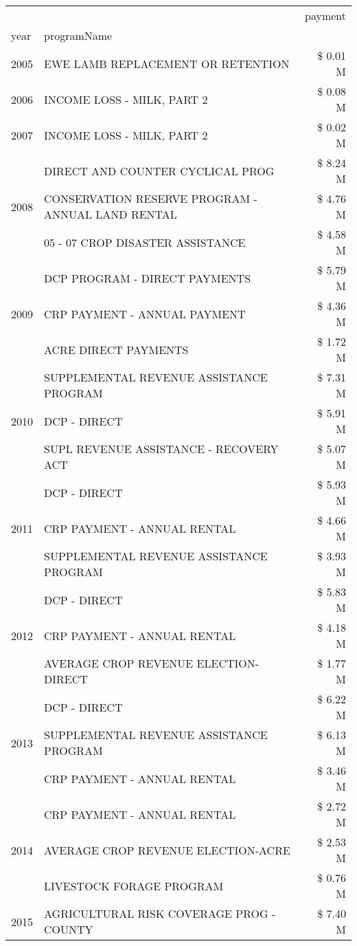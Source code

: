\begin{tabular}{llr}
\toprule
 &  & payment \\
year & programName &  \\
\midrule
2005 & EWE LAMB REPLACEMENT OR RETENTION & \$ 0.01 M \\
\cline{1-3}
2006 & INCOME LOSS - MILK, PART 2 & \$ 0.08 M \\
\cline{1-3}
2007 & INCOME LOSS - MILK, PART 2 & \$ 0.02 M \\
\cline{1-3}
\multirow[t]{3}{*}{2008} & DIRECT AND COUNTER CYCLICAL PROG & \$ 8.24 M \\
 & CONSERVATION RESERVE PROGRAM - ANNUAL LAND RENTAL & \$ 4.76 M \\
 & 05 - 07 CROP DISASTER ASSISTANCE & \$ 4.58 M \\
\cline{1-3}
\multirow[t]{3}{*}{2009} & DCP PROGRAM - DIRECT PAYMENTS & \$ 5.79 M \\
 & CRP PAYMENT - ANNUAL PAYMENT & \$ 4.36 M \\
 & ACRE DIRECT PAYMENTS & \$ 1.72 M \\
\cline{1-3}
\multirow[t]{3}{*}{2010} & SUPPLEMENTAL REVENUE ASSISTANCE PROGRAM & \$ 7.31 M \\
 & DCP - DIRECT & \$ 5.91 M \\
 & SUPL REVENUE ASSISTANCE - RECOVERY ACT & \$ 5.07 M \\
\cline{1-3}
\multirow[t]{3}{*}{2011} & DCP - DIRECT & \$ 5.93 M \\
 & CRP PAYMENT - ANNUAL RENTAL & \$ 4.66 M \\
 & SUPPLEMENTAL REVENUE ASSISTANCE PROGRAM & \$ 3.93 M \\
\cline{1-3}
\multirow[t]{3}{*}{2012} & DCP - DIRECT & \$ 5.83 M \\
 & CRP PAYMENT - ANNUAL RENTAL & \$ 4.18 M \\
 & AVERAGE CROP REVENUE ELECTION-DIRECT & \$ 1.77 M \\
\cline{1-3}
\multirow[t]{3}{*}{2013} & DCP - DIRECT & \$ 6.22 M \\
 & SUPPLEMENTAL REVENUE ASSISTANCE PROGRAM & \$ 6.13 M \\
 & CRP PAYMENT - ANNUAL RENTAL & \$ 3.46 M \\
\cline{1-3}
\multirow[t]{3}{*}{2014} & CRP PAYMENT - ANNUAL RENTAL & \$ 2.72 M \\
 & AVERAGE CROP REVENUE ELECTION-ACRE & \$ 2.53 M \\
 & LIVESTOCK FORAGE PROGRAM & \$ 0.76 M \\
\cline{1-3}
\multirow[t]{3}{*}{2015} & AGRICULTURAL RISK COVERAGE PROG - COUNTY & \$ 7.40 M \\

\end{tabular}
